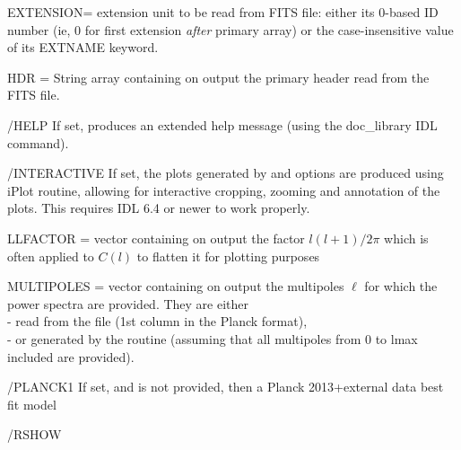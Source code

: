 \begin{keywords}
  \begin{kwlist}{} %
       \item[EXTENSION=]%
	extension unit to be read from FITS file: 
 either its 0-based ID number (ie, 0 for first extension {\em after} primary array) 
 or the case-insensitive value of its EXTNAME keyword.
    \item[HDR =] %
	String array containing on output the primary header
      read from the FITS file. 
    \item[/HELP] %
	If set, produces an extended help message (using the doc\_library
    IDL command). 
    \item[/INTERACTIVE] %
	If set, the plots generated by  and  options are produced using iPlot routine, allowing 
           for interactive cropping, zooming and annotation of the plots. This
           requires IDL 6.4 or newer to work properly.
    \item[LLFACTOR =] %
	vector containing on output the factor $l(l+1)/2\pi$ which is often
          applied to $C(l)$ to flatten it for plotting purposes
    \item[MULTIPOLES =] %
	vector containing on output the multipoles
    $\ell$ for which the power spectra are provided. They are either\\
           - read from the file (1st column in the Planck format),\\
          - or generated by the routine (assuming that all
               multipoles from 0 to lmax included are provided).
%
    \item[/PLANCK1] %
           If set, and  
           is not provided, then a Planck 2013+external data best fit
          model
%
%
    \item[/RSHOW] %

\end{kwlist}
\end{keywords}
